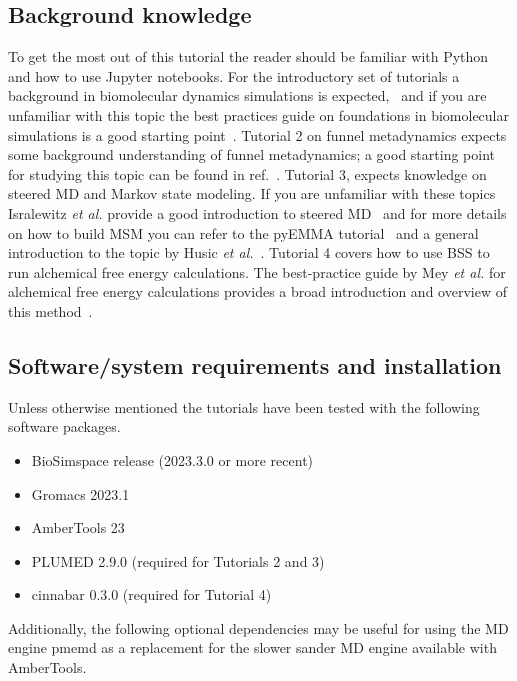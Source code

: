 \documentclass[9pt,tutorial]{livecoms}
\begin{document}
\subsection{Background knowledge}
To get the most out of this tutorial the reader should be familiar with Python and how to use Jupyter notebooks. For the introductory set of tutorials a background in biomolecular dynamics simulations is expected,~\cite{Huggins2018} and if you are unfamiliar with this topic the best practices guide on foundations in biomolecular simulations is a good starting point~\cite{Braun2019}. Tutorial 2 on funnel metadynamics expects some background understanding of funnel metadynamics; a good starting point for studying this topic can be found in ref.~\cite{Limongelli2013}. Tutorial 3, expects knowledge on steered MD and Markov state modeling. If you are unfamiliar with these topics Isralewitz \emph{et al.} provide a good introduction to steered MD~\cite{Isralewitz2001} and for more details on how to build MSM you can refer to the pyEMMA tutorial~\cite{Wehmeyer_2019} and a general introduction to the topic by Husic \textit{et al.}~\cite{sMD_Husic-msm}.
Tutorial 4 covers how to use BSS to run alchemical free energy calculations. The best-practice guide by Mey \textit{et al.} for alchemical free energy calculations provides a broad introduction and overview of this method~\cite{mey2020best}.

\subsection{Software/system requirements and installation}

Unless otherwise mentioned the tutorials have been tested with the following 
software packages.

\begin{itemize}
    \item BioSimspace release (2023.3.0 or more recent)  
    \item Gromacs 2023.1 
    \item AmberTools 23 
    \item PLUMED 2.9.0 (required for Tutorials 2 and 3)
    \item cinnabar 0.3.0 (required for Tutorial 4)
\end{itemize}

Additionally, the following optional dependencies may be useful for using the MD engine pmemd as a replacement for the slower sander MD engine available with AmberTools.
\end{document}

